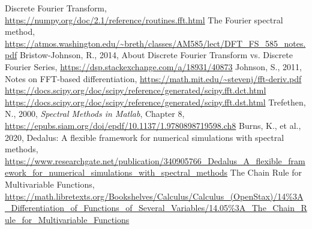 \documentclass[10pt]{article}
\begin{document}
\begin{thebibliography}{99}
	Discrete Fourier Transform, \url{https://numpy.org/doc/2.1/reference/routines.fft.html}
	The Fourier spectral method, \url{https://atmos.washington.edu/~breth/classes/AM585/lect/DFT_FS_585_notes.pdf}
	Bristow-Johnson, R., 2014, About Discrete Fourier Transform vs. Discrete Fourier Series, \url{https://dsp.stackexchange.com/a/18931/40873}
	Johnson, S., 2011, Notes on FFT-based differentiation, \url{https://math.mit.edu/~stevenj/fft-deriv.pdf}
	\url{https://docs.scipy.org/doc/scipy/reference/generated/scipy.fft.dct.html}
	\url{https://docs.scipy.org/doc/scipy/reference/generated/scipy.fft.dst.html}
	Trefethen, N., 2000, \textit{Spectral Methods in Matlab}, Chapter 8, \url{https://epubs.siam.org/doi/epdf/10.1137/1.9780898719598.ch8}
	Burns, K., et al., 2020, Dedalus: A flexible framework for numerical simulations with spectral methods, \url{https://www.researchgate.net/publication/340905766_Dedalus_A_flexible_framework_for_numerical_simulations_with_spectral_methods}
	The Chain Rule for Multivariable Functions, \url{https://math.libretexts.org/Bookshelves/Calculus/Calculus_(OpenStax)/14%3A_Differentiation_of_Functions_of_Several_Variables/14.05%3A_The_Chain_Rule_for_Multivariable_Functions}
\end{thebibliography}
\end{document}
